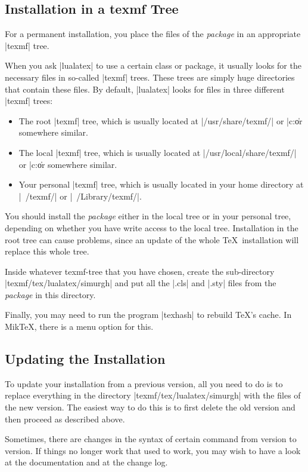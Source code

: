 \documentclass{simurgh-doc}
\begin{document}
\subsection{Installation in a texmf Tree}

For a permanent installation, you place the files of the \simurgh{} \textit{package} in an appropriate |texmf| tree. 

When you ask |lualatex| to use a certain class or package, it usually looks for the necessary files in so-called |texmf| trees. These trees are simply huge directories that contain these files. By default, |lualatex| looks for files in three different |texmf| trees:
\begin{itemize}
  \item The root |texmf| tree, which is usually located at |/usr/share/texmf/| or |c:\texmf\| or somewhere similar.
  \item  The local  |texmf| tree, which is usually located at |/usr/local/share/texmf/| or |c:\localtexmf\| or somewhere similar.
  \item  Your personal  |texmf| tree, which is usually located in your home directory at |~/texmf/| or |~/Library/texmf/|.   
\end{itemize}

You should install the \textit{package} either in the local tree or in your personal tree, depending on whether you have write access to the local tree. Installation in the root tree can cause problems, since an update of the whole \TeX\ installation will replace this whole tree.

Inside whatever texmf-tree that you have chosen, create the sub-directory |texmf/tex/lualatex/simurgh| and put all the |.cls| and |.sty| files from the \textit{package} in this directory.

Finally, you may need to run the program |texhash| to rebuild \TeX's cache. In Mik\TeX, there is a menu option for this.

\subsection{Updating the Installation}

To update your installation from a previous version, all you need to do is to replace everything in the directory |texmf/tex/lualatex/simurgh| with the files of the new version. The easiest way to do this is to first delete the old version and then proceed as described above.

Sometimes, there are changes in the syntax of certain command from version to version. If things no longer work that used to work, you may wish to have a look at the documentation and at the change log. 
\end{document}
